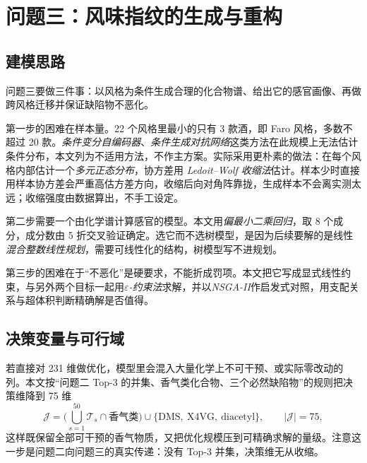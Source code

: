\section{问题三：风味指纹的生成与重构}

\subsection{建模思路}

问题三要做三件事：以风格为条件生成合理的化合物谱、给出它的感官画像、再做跨风格迁移并保证缺陷物不恶化。

第一步的困难在样本量。22 个风格里最小的只有 3 款酒，即 Faro 风格，多数不超过 20 款。\emph{条件变分自编码器}、\emph{条件生成对抗网络}这类方法在此规模上无法估计条件分布\cite{xu2019}，本文列为不适用方法，不作主方案。实际采用更朴素的做法：在每个风格内部估计一个\emph{多元正态分布}，协方差用 \emph{Ledoit--Wolf 收缩法}\cite{ledoit2004}估计。样本少时直接用样本协方差会严重高估方差方向，收缩后向对角阵靠拢，生成样本不会离实测太远；收缩强度由数据算出，不手工设定。

第二步需要一个由化学谱计算感官的模型。本文用\emph{偏最小二乘回归}\cite{wold2001}，取 8 个成分，成分数由 5 折交叉验证确定。选它而不选树模型，是因为后续要解的是线性\emph{混合整数线性规划}，需要可线性化的结构，树模型写不进规划。

第三步的困难在于“不恶化”是硬要求，不能折成罚项。本文把它写成显式线性约束，与另外两个目标一起用\emph{$\varepsilon$-约束法}\cite{mavrotas2009}求解，并以\emph{NSGA-II}\cite{deb2002}作启发式对照，用支配关系与超体积判断精确解是否值得。

\subsection{决策变量与可行域}

若直接对 231 维做优化，模型里会混入大量化学上不可干预、或实际零改动的列。本文按“问题二 Top-3 的并集、香气类化合物、三个必然缺陷物”的规则把决策维降到 75 维
\begin{equation}
  \mathcal{J}=\Big(\bigcup_{s=1}^{50}\mathcal{T}_s\cap\text{香气类}\Big)\cup\{\text{DMS},\ \text{X4VG},\ \text{diacetyl}\},
  \qquad |\mathcal{J}|=75,
\end{equation}
这样既保留全部可干预的香气物质，又把优化规模压到可精确求解的量级。注意这一步是问题二向问题三的真实传递：没有 Top-3 并集，决策维无从收缩。

